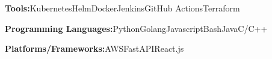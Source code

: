 
\begin{cvlist}
  {
    \begin{cvitems}
    \item {\textbf{Tools:}{\enskip}Kubernetes{\enskip\cdotp\enskip}Helm{\enskip\cdotp\enskip}Docker{\enskip\cdotp\enskip}Jenkins{\enskip\cdotp\enskip}GitHub Actions{\enskip\cdotp\enskip}Terraform}
      \item {\textbf{Programming Languages:}{\enskip}Python{\enskip\cdotp\enskip}Golang{\enskip\cdotp\enskip}Javascript{\enskip\cdotp\enskip}Bash{\enskip\cdotp\enskip}Java{\enskip\cdotp\enskip}C/C++}
      \item {\textbf{Platforms/Frameworks:}{\enskip}AWS{\enskip\cdotp\enskip}FastAPI{\enskip\cdotp\enskip}React.js}
    \end{cvitems}
  }
\end{cvlist}

